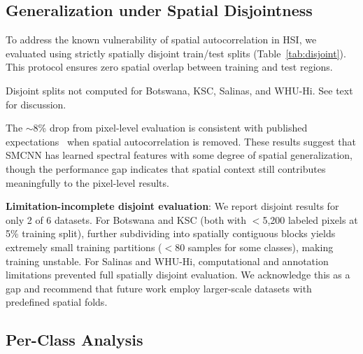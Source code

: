 \documentclass[conference]{IEEEtran}
\begin{document}
\subsection{Generalization under Spatial Disjointness}

To address the known vulnerability of spatial autocorrelation in HSI, we evaluated using strictly spatially disjoint train/test splits (Table~\ref{tab:disjoint}). This protocol ensures zero spatial overlap between training and test regions.

\begin{table}[!t]
\caption{Spatially Disjoint Evaluation}
\label{tab:disjoint}
\centering
{}
\begin{flushleft}
\footnotesize{Disjoint splits not computed for Botswana, KSC, Salinas, and WHU-Hi. See text for discussion.}
\end{flushleft}
\end{table}

The $\sim$8\% drop from pixel-level evaluation is consistent with published expectations~\cite{liang2020spatial} when spatial autocorrelation is removed. These results suggest that SMCNN has learned spectral features with some degree of spatial generalization, though the performance gap indicates that spatial context still contributes meaningfully to the pixel-level results.

\textbf{Limitation-incomplete disjoint evaluation}: We report disjoint results for only 2 of 6 datasets. For Botswana and KSC (both with $<$5,200 labeled pixels at 5\% training split), further subdividing into spatially contiguous blocks yields extremely small training partitions ($<$80 samples for some classes), making training unstable. For Salinas and WHU-Hi, computational and annotation limitations prevented full spatially disjoint evaluation. We acknowledge this as a gap and recommend that future work employ larger-scale datasets with predefined spatial folds.

\subsection{Per-Class Analysis}
\end{document}
